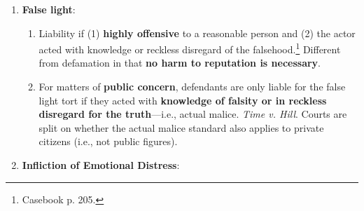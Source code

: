 \begin{enumerate}
\begin{enumerate}
\begin{enumerate}
            (spoken).
            \item Computer service providers are not publishers (a category 
            which 
            includes distributors). Also, CDA \S\ 230 did not create notice-based 
            liability for service providers. \emph{Zeran v. AOL}.
            \item Does CDA \S\ 230 provide too much immunity from tort liability?  
            \textbf{Blumenthal v. Drudge}.
            \item To recover for defamation, \textbf{public officials} must prove 
            \textbf{actual malice}---i.e., knowledge that the statement was false 
            or made with reckless disregard for whether it was false or not.
            \item \textbf{Private citizens do not have to prove actual malice} to 
            recover for actual injuries. However, they have to prove actual malice 
            to recover \textbf{punitive damages}, or else juries might punish 
            unpopular views. \emph{Gertz v. Robert Welch}.
            \item Celebrity divorces are not public controversies. \emph{Time v. 
            Firestone}.
            \item People can become \textbf{``voluntary limited-purpose public 
            figure[s]''} by injecting themselves into news stories. \emph{Atlanta 
            Journal-Constitution v. Jewell}.
        \end{enumerate}
        \item \textbf{False light}:
        \begin{enumerate}
            \item Liability if (1) \textbf{highly offensive} to a reasonable 
            person and (2) the actor acted with knowledge or reckless 
            disregard of the falsehood.\footnote{Casebook p. 205.} Different 
            from defamation in that \textbf{no harm to reputation is 
            necessary}.
            \item For matters of \textbf{public concern}, defendants are only 
            liable for the false light tort if they acted with 
            \textbf{knowledge of falsity or in reckless disregard for the 
            truth}---i.e., actual malice. \emph{Time v. Hill}. Courts are 
            split on whether the actual malice standard also applies to 
            private citizens (i.e., not public figures).
        \end{enumerate}
        \item \textbf{Infliction of Emotional Distress}:

\end{enumerate}
\end{enumerate}
